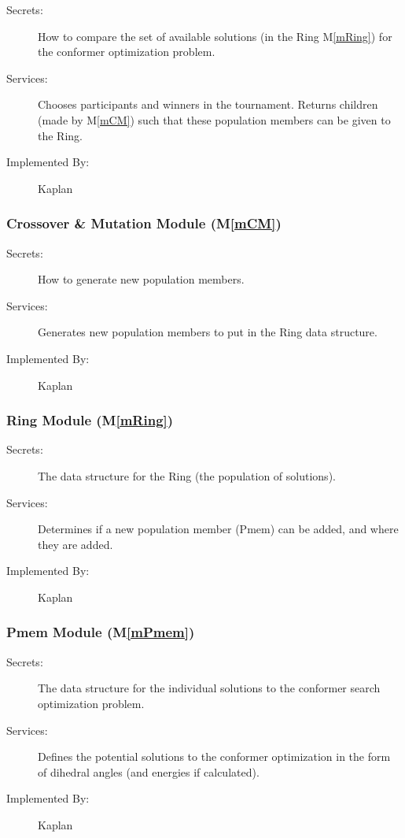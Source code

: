 \documentclass[12pt, titlepage]{article}
\newcommand{\mref}[1]{M\ref{#1}}
\newcommand{\progname}{Kaplan} %
\begin{document}
\begin{description}
	\item[Secrets:] How to compare the set of available solutions (in the Ring 
	\mref{mRing}) for the conformer optimization problem.
	\item[Services:] Chooses participants and winners in the 
	tournament. Returns children (made by \mref{mCM}) such that these 
	population members can be given to the Ring.
	\item[Implemented By:] \progname{}
\end{description}

\subsubsection{Crossover \& Mutation Module (\mref{mCM})}

\begin{description}
	\item[Secrets:] How to generate new population members.
	\item[Services:] Generates new population members to put in the Ring data 
	structure.
	\item[Implemented By:] \progname{}
\end{description}

\subsubsection{Ring Module (\mref{mRing})}

\begin{description}
	\item[Secrets:] The data structure for the Ring (the population of 
	solutions).
	\item[Services:] Determines if a new population member (Pmem) can be added, 
	and where they are added.
	\item[Implemented By:] \progname{}
\end{description}


\subsubsection{Pmem Module (\mref{mPmem})}

\begin{description}
	\item[Secrets:] The data structure for the individual solutions to the 
	conformer search optimization problem.
	\item[Services:] Defines the potential solutions to the conformer 
	optimization in the form of dihedral angles (and energies if calculated). 
	\item[Implemented By:] \progname{}
\end{description}
\end{document}

